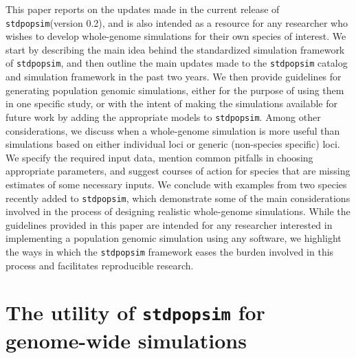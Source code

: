 \documentclass[hidelinks]{article}
\newcommand{\stdpopsim}{\texttt{stdpopsim}\xspace}
\begin{document}
This paper reports on the updates made in the current release of \stdpopsim  (version 0.2),
and is also intended as a resource for any researcher
who wishes to develop whole-genome simulations for their own species of interest.
We start by describing the main idea behind the standardized simulation framework
of \stdpopsim,
and then outline the main updates made to the \stdpopsim catalog and simulation framework
in the past two years.
We then provide guidelines for
generating population genomic simulations, either for the purpose of using them in one specific study,
or with the intent of making the simulations available for future work by adding the appropriate models to \stdpopsim.
Among other considerations, we discuss when a whole-genome simulation is more useful than
simulations based on either individual loci or generic (non-species specific) loci.
We specify the required input data,
mention common pitfalls in choosing appropriate parameters,
and suggest courses of action for species that are missing estimates of some necessary inputs.
We conclude with examples from two species recently added to \stdpopsim,
which demonstrate some of the main considerations involved in the process of designing realistic whole-genome simulations.
While the guidelines provided in this paper are intended for any researcher interested in implementing a population genomic simulation using any software,
we highlight the ways in which the \stdpopsim framework eases the burden involved in this process and facilitates reproducible research.




\section*{The utility of \stdpopsim for genome-wide simulations}
    \label{sec:std-sim}
\end{document}
